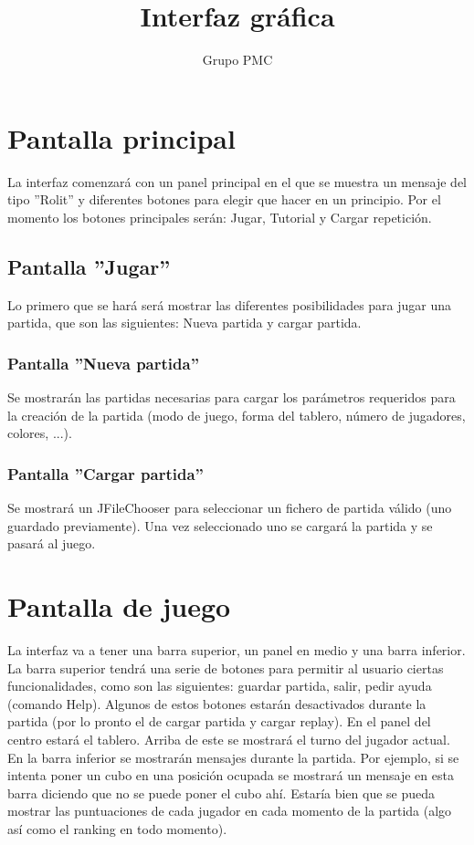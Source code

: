 \documentclass[14pt]{extreport}
\author{Grupo PMC}
\begin{document}
\title{Interfaz gráfica}
\maketitle


\section*{Pantalla principal}
La interfaz comenzará con un panel principal en el que se muestra un mensaje del tipo ''Rolit'' y diferentes botones para elegir que hacer en un principio. Por el momento los botones principales serán: Jugar, Tutorial y Cargar repetición.

\subsection*{Pantalla ''Jugar''}
Lo primero que se hará será mostrar las diferentes posibilidades para jugar una partida, que son las siguientes: Nueva partida y cargar partida.

\subsubsection*{Pantalla ''Nueva partida''}
Se mostrarán las partidas necesarias para cargar los parámetros requeridos para la creación de la partida (modo de juego, forma del tablero, número de jugadores, colores, ...).

\subsubsection*{Pantalla ''Cargar partida''}
Se mostrará un JFileChooser para seleccionar un fichero de partida válido (uno guardado previamente). Una vez seleccionado uno se cargará la partida y se pasará al juego.

\section*{Pantalla de juego}
La interfaz va a tener una barra superior, un panel en medio y una barra inferior.
La barra superior tendrá una serie de botones para permitir al usuario ciertas funcionalidades, como son las siguientes: guardar partida, salir, pedir ayuda (comando Help). Algunos de estos botones estarán desactivados durante la partida (por lo pronto el de cargar partida y cargar replay).
En el panel del centro estará el tablero. Arriba de este se mostrará el turno del jugador actual.
En la barra inferior se mostrarán mensajes durante la partida. Por ejemplo, si se intenta poner un cubo en una posición ocupada se mostrará un mensaje en esta barra diciendo que no se puede poner el cubo ahí.
Estaría bien que se pueda mostrar las puntuaciones de cada jugador en cada momento de la partida (algo así como el ranking en todo momento).
\end{document}
